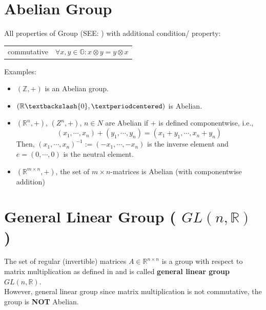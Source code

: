 \section{Abelian Group \cite{mfml-1}}\label{Abelian Group}

All properties of Group (SEE: ) with additional condition/ property:

\begin{table}[H]
    \begin{tabular}{l l}
        commutative \hspace{0.5cm} & $\forall x,y \in \mathbb{G}:x\otimes y = y\otimes x$ \\
    \end{tabular}
\end{table}

Examples:
\begin{itemize}
    \item $(\mathbb{Z}, +)$ is an Abelian group.
    \item $(\mathbb{R}\textbackslash {0}, ·)$ is Abelian.
    \item $(\mathbb{R}^n, +)$, $(Z^n, +)$, $n \in N$ are Abelian if $+$ is defined componentwise, i.e., 
    \[
        (x_1, \cdots , x_n) + (y_1, \cdots , y_n) = (x_1 + y_1, \cdots , x_n + y_n)
    \]
    Then, $(x_1, \cdots , x_n)^{-1} := (-x_1, \cdots , -x_n)$ is the inverse element and $e = (0, \cdots , 0)$ is the neutral element.
    \item $(\mathbb{R}^{m\times n}, +)$, the set of $m \times n$-matrices is Abelian (with componentwise addition)
\end{itemize}










\section{General Linear Group ( $GL(n,\mathbb{R})$ ) \cite{mfml-1}}\label{General Linear Group}

The set of regular (invertible) matrices $A \in \mathbb{R}^{n \times n}$ is a group with respect to matrix multiplication as defined in and is called \textbf{general linear group} $GL(n, \mathbb{R})$.\\
However, general linear group since matrix multiplication is not commutative, the group is \textbf{NOT} Abelian.

